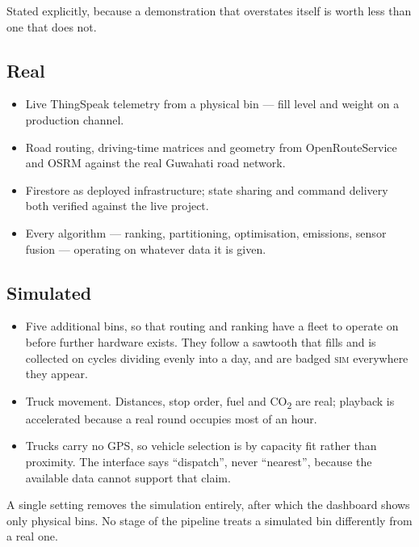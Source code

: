 \documentclass[11pt,a4paper]{article}
\newcommand{\co}{CO\textsubscript{2}}
\begin{document}
Stated explicitly, because a demonstration that overstates itself is
worth less than one that does not.

\subsection{Real}

\begin{itemize}
  \item Live ThingSpeak telemetry from a physical bin --- fill level and
        weight on a production channel.
  \item Road routing, driving-time matrices and geometry from
        OpenRouteService and OSRM against the real Guwahati road network.
  \item Firestore as deployed infrastructure; state sharing and command
        delivery both verified against the live project.
  \item Every algorithm --- ranking, partitioning, optimisation, emissions,
        sensor fusion --- operating on whatever data it is given.
\end{itemize}

\subsection{Simulated}

\begin{itemize}
  \item Five additional bins, so that routing and ranking have a fleet to
        operate on before further hardware exists. They follow a sawtooth
        that fills and is collected on cycles dividing evenly into a day,
        and are badged \textsc{sim} everywhere they appear.
  \item Truck movement. Distances, stop order, fuel and \co{} are real;
        playback is accelerated because a real round occupies most of an hour.
  \item Trucks carry no GPS, so vehicle selection is by capacity fit rather
        than proximity. The interface says ``dispatch'', never ``nearest'',
        because the available data cannot support that claim.
\end{itemize}

A single setting removes the simulation entirely, after which the
dashboard shows only physical bins. No stage of the pipeline treats a
simulated bin differently from a real one.

\end{document}
